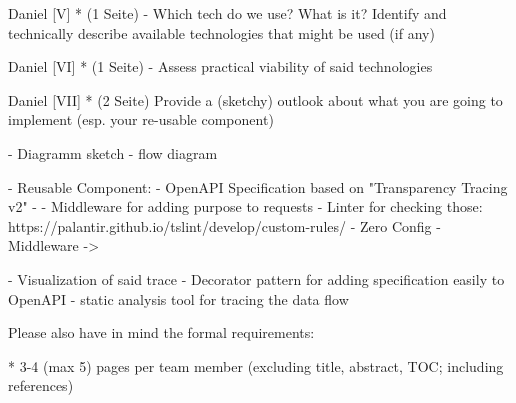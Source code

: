 Daniel 
[V] * (1 Seite) - Which tech do we use? What is it? 
Identify and technically describe available technologies that might be used (if any)


Daniel 
[VI] * (1 Seite) - 
Assess practical viability of said technologies




Daniel 
[VII] * (2 Seite)
Provide a (sketchy) outlook about what you are going to implement (esp. your re-usable component)

- Diagramm sketch 
- flow diagram 

 - Reusable Component: 
    - OpenAPI Specification based on "Transparency Tracing v2"
      - 
    - Middleware for adding purpose to requests 
    - Linter for checking those: https://palantir.github.io/tslint/develop/custom-rules/
    - Zero Config - Middleware -> %
    
    
    - Visualization of said trace 
    - Decorator pattern for adding specification easily to OpenAPI %
    - static analysis tool for tracing the data flow




Please also have in mind the formal requirements:

*
3-4 (max 5) pages per team member (excluding title, abstract, TOC;
including references)

